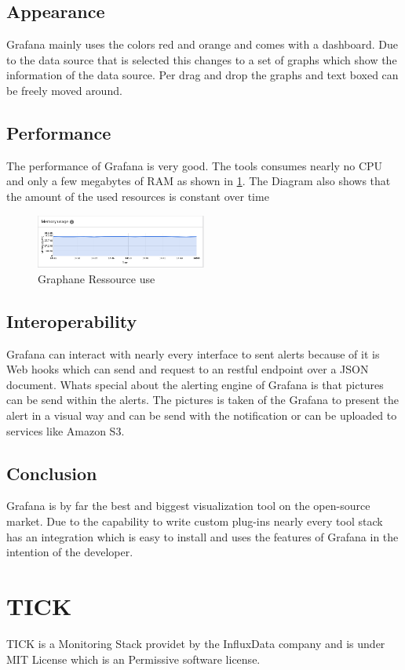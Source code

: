 \subsection{Appearance}%
Grafana mainly uses the colors red and orange and comes with a dashboard. Due to the data source that is selected this changes to a set of graphs which show the information of the data source. Per drag and drop the graphs and text boxed can be freely moved around. 
\subsection{Performance}
The performance of Grafana is very good. The tools consumes nearly no CPU and only a few megabytes of RAM as shown in \cref{fig:Grafan_RAM}. The Diagram also shows that the amount of the used resources is constant over time
\begin{figure}
\centering
\includegraphics[width=0.5\textwidth]{Bilder/Performance/Grafan_RAM}
\caption{Graphane Ressource use}
\label{fig:Grafan_RAM}
\end{figure}
\subsection{Interoperability}
Grafana can interact with nearly every interface to sent alerts because of it is Web hooks which can send and request to an restful endpoint over a JSON document. Whats special about the alerting engine of Grafana is that pictures can be send within the alerts. The pictures is taken of the Grafana to present the alert in a visual way and can be send with the notification or can be uploaded to services like Amazon S3.

\subsection{Conclusion}
Grafana is by far the best and biggest visualization tool on the open-source market. Due to the capability to write custom plug-ins nearly every tool stack has an integration which is easy to install and uses the features of Grafana in the intention of the developer.

\section{TICK}
\label{tick}
TICK is a Monitoring Stack providet by the InfluxData company and is under MIT License which is an Permissive software license.
